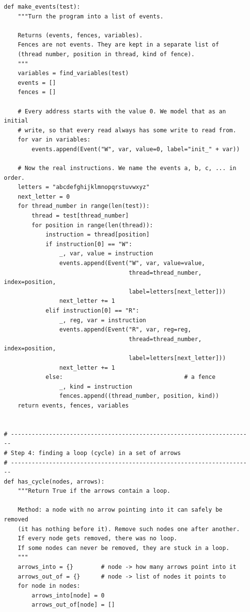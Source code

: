 \begin{lstlisting}[style=vspython]
def make_events(test):
    """Turn the program into a list of events.

    Returns (events, fences, variables).
    Fences are not events. They are kept in a separate list of
    (thread number, position in thread, kind of fence).
    """
    variables = find_variables(test)
    events = []
    fences = []

    # Every address starts with the value 0. We model that as an initial
    # write, so that every read always has some write to read from.
    for var in variables:
        events.append(Event("W", var, value=0, label="init_" + var))

    # Now the real instructions. We name the events a, b, c, ... in order.
    letters = "abcdefghijklmnopqrstuvwxyz"
    next_letter = 0
    for thread_number in range(len(test)):
        thread = test[thread_number]
        for position in range(len(thread)):
            instruction = thread[position]
            if instruction[0] == "W":
                _, var, value = instruction
                events.append(Event("W", var, value=value,
                                    thread=thread_number, index=position,
                                    label=letters[next_letter]))
                next_letter += 1
            elif instruction[0] == "R":
                _, reg, var = instruction
                events.append(Event("R", var, reg=reg,
                                    thread=thread_number, index=position,
                                    label=letters[next_letter]))
                next_letter += 1
            else:                                   # a fence
                _, kind = instruction
                fences.append((thread_number, position, kind))
    return events, fences, variables


# ----------------------------------------------------------------------
# Step 4: finding a loop (cycle) in a set of arrows
# ----------------------------------------------------------------------
def has_cycle(nodes, arrows):
    """Return True if the arrows contain a loop.

    Method: a node with no arrow pointing into it can safely be removed
    (it has nothing before it). Remove such nodes one after another.
    If every node gets removed, there was no loop.
    If some nodes can never be removed, they are stuck in a loop.
    """
    arrows_into = {}        # node -> how many arrows point into it
    arrows_out_of = {}      # node -> list of nodes it points to
    for node in nodes:
        arrows_into[node] = 0
        arrows_out_of[node] = []


\end{lstlisting}
